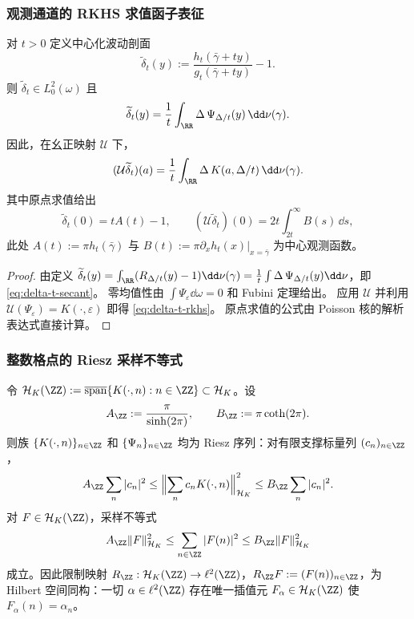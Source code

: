 \subsubsection{观测通道的 RKHS 求值函子表征}

\begin{theorem}\label{thm:poisson-channel-rkhs}
对 \(t>0\) 定义中心化波动剖面
\[
\widetilde\delta_t(y):=\frac{h_t(\bar\gamma+ty)}{g_t(\bar\gamma+ty)}-1.
\]
则 \(\widetilde\delta_t\in L^2_0(\omega)\) 且
\begin{equation}\label{eq:delta-t-secant}
\widetilde\delta_t(y)
=\frac{1}{t}\int_{\RR}\Delta\,\Psi_{\Delta/t}(y)\,\dd\nu(\gamma).
\end{equation}
因此，在幺正映射 \(\mathcal{U}\) 下，
\begin{equation}\label{eq:delta-t-rkhs}
(\mathcal{U}\widetilde\delta_t)(a)
=\frac{1}{t}\int_{\RR}\Delta\,K(a,\Delta/t)\,\dd\nu(\gamma).
\end{equation}
其中原点求值给出
\[
\widetilde\delta_t(0)=tA(t)-1,
\qquad
(\mathcal{U}\widetilde\delta_t)(0)=2t\!\int_{2t}^{\infty}\!B(s)\,\dd s,
\]
此处 \(A(t):=\pi h_t(\bar\gamma)\) 与 \(B(t):=\pi\partial_x h_t(x)|_{x=\bar\gamma}\) 为中心观测函数。
\end{theorem}

\begin{proof}
由定义 \(\widetilde\delta_t(y)=\int_{\RR}(R_{\Delta/t}(y)-1)\dd\nu(\gamma)=\frac{1}{t}\int\Delta\,\Psi_{\Delta/t}(y)\dd\nu\)，即 \eqref{eq:delta-t-secant}。
零均值性由 \(\int\Psi_\varepsilon\dd\omega=0\) 和 Fubini 定理给出。
应用 \(\mathcal{U}\) 并利用 \(\mathcal{U}(\Psi_\varepsilon)=K(\cdot,\varepsilon)\) 即得 \eqref{eq:delta-t-rkhs}。
原点求值的公式由 Poisson 核的解析表达式直接计算。
\end{proof}

\subsubsection{整数格点的 Riesz 采样不等式}

\begin{theorem}\label{thm:poisson-lattice-sampling}
令 \(\mathcal{H}_K(\ZZ):=\overline{\operatorname{span}}\{K(\cdot,n):n\in\ZZ\}\subset\mathcal{H}_K\)。设
\begin{equation}\label{eq:lattice-sampling-constants}
A_{\ZZ}:=\frac{\pi}{\sinh(2\pi)},
\qquad
B_{\ZZ}:=\pi\coth(2\pi).
\end{equation}
则族 \(\{K(\cdot,n)\}_{n\in\ZZ}\) 和 \(\{\Psi_n\}_{n\in\ZZ}\) 均为 Riesz 序列：对有限支撑标量列 \((c_n)_{n\in\ZZ}\)，
\[
A_{\ZZ}\sum_{n}|c_n|^2
\le
\Bigl\|\sum_{n}c_nK(\cdot,n)\Bigr\|_{\mathcal{H}_K}^2
\le
B_{\ZZ}\sum_{n}|c_n|^2.
\]
对 \(F\in\mathcal{H}_K(\ZZ)\)，采样不等式
\[
A_{\ZZ}\|F\|_{\mathcal{H}_K}^2
\le\sum_{n\in\ZZ}|F(n)|^2
\le B_{\ZZ}\|F\|_{\mathcal{H}_K}^2
\]
成立。因此限制映射 \(R_{\ZZ}:\mathcal{H}_K(\ZZ)\to\ell^2(\ZZ)\)，\(R_{\ZZ}F:=(F(n))_{n\in\ZZ}\)，为 Hilbert 空间同构：一切 \(\alpha\in\ell^2(\ZZ)\) 存在唯一插值元 \(F_\alpha\in\mathcal{H}_K(\ZZ)\) 使 \(F_\alpha(n)=\alpha_n\)。
\end{theorem}

